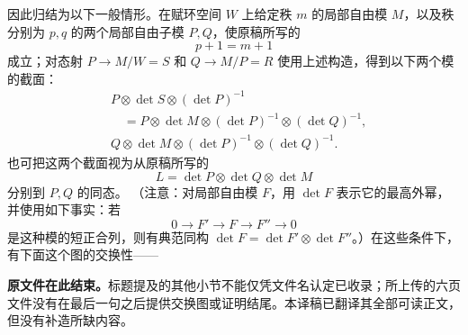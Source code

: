 因此归结为以下一般情形。在赋环空间 $W$ 上给定秩 $m$ 的局部自由模 $M$，以及秩分别为 $p,q$ 的两个局部自由子模 $P,Q$，使原稿所写的
\[
 p+1=m+1
\]
成立；对态射 $P\to M/W=S$ 和 $Q\to M/P=R$ 使用上述构造，得到以下两个模的截面：
\begin{align*}
 &P\otimes\det S\otimes(\det P)^{-1}\\
 &\hspace{1em}=P\otimes\det M\otimes(\det P)^{-1}\otimes(\det Q)^{-1},\\
 &Q\otimes\det M\otimes(\det P)^{-1}\otimes(\det Q)^{-1}.
\end{align*}
也可把这两个截面视为从原稿所写的
\[
 L=\det P\otimes\det Q\otimes\det M
\]
分别到 $P,Q$ 的同态。
（注意：对局部自由模 $F$，用 $\det F$ 表示它的最高外幂，并使用如下事实：若
\[
 0\longrightarrow F'\longrightarrow F\longrightarrow F''\longrightarrow0
\]
是这种模的短正合列，则有典范同构 $\det F=\det F'\otimes\det F''$。）在这些条件下，有下面这个图的交换性——

\par\bigskip\noindent\textbf{原文件在此结束。}标题提及的其他小节不能仅凭文件名认定已收录；所上传的六页文件没有在最后一句之后提供交换图或证明结尾。本译稿已翻译其全部可读正文，但没有补造所缺内容。
